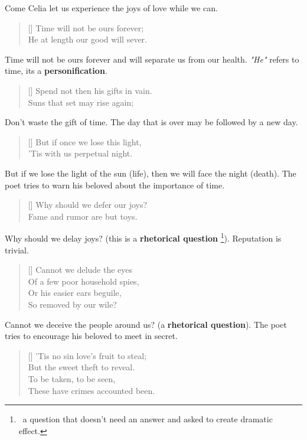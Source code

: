 Come Celia let us experience the joys of love while we can.

\begin{verse}[\versewidth]
{\fontverse
Time will not be ours forever;\\
He at length our good will sever.
}
\end{verse}

Time will not be ours forever and will separate us from 
our health. \textit{"He"} refers to time, its a \textbf{personification}.

\begin{verse}[\versewidth]
{\fontverse
Spend not then his gifts in vain.\\
Suns that set may rise again;
}
\end{verse}

Don't waste the gift of time. The day that is over 
may be followed by a new day.

\begin{verse}[\versewidth]
{\fontverse
But if once we lose this light,\\
'Tis with us perpetual night.
}
\end{verse}

But if we lose the light of the sun (life), then 
we will face the night (death). The poet tries to warn 
his beloved about the importance of time.


\newpage
\begin{verse}[\versewidth]
{\fontverse
Why should we defer our joys?\\
Fame and rumor are but toys.
}
\end{verse}

Why should we delay joys? (this is a \textbf{rhetorical question}
\footnote{\, a question that doesn't need an answer and asked to create dramatic effect.}).
Reputation is trivial. 

\begin{verse}[\versewidth]
{\fontverse
Cannot we delude the eyes\\
Of a few poor household spies,\\
Or his easier ears beguile,\\
So removed by our wile?
}
\end{verse}

Cannot we deceive the people around us? (a \textbf{rhetorical question}).
The poet tries to encourage his beloved to meet in secret.

\begin{verse}[\versewidth]
{\fontverse
'Tis no sin love's fruit to steal;\\
But the sweet theft to reveal.\\
To be taken, to be seen,\\
These have crimes accounted been.
}
\end{verse}


